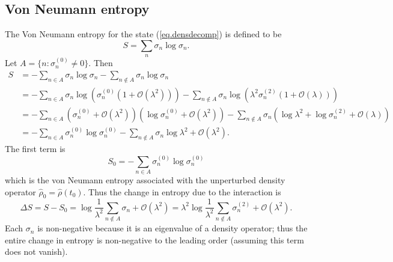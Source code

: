 \documentclass[11pt]{article}
\newcommand{\Od}[1]{\mathcal{O}{\left(#1\right)}}
\newcommand{\op}[1]{\hat{#1}}
\theoremstyle{theorem}
\theoremstyle{remark}
\theoremstyle{step}
\theoremstyle{gap}
\begin{document}
\subsection{Von Neumann entropy}

The Von Neumann entropy for the state (\ref{eq.densdecomp}) is defined to be
\[
S = \sum_{n} \sigma_n \log \sigma_n.
\]
Let \(A = \{n : \sigma_n^{(0)} \neq 0\}\). Then
\begin{align*}
S &= -\sum_{n \in A} \sigma_n \log \sigma_n-\sum_{n \not\in A} \sigma_n \log \sigma_n \\
&= - \sum_{n \in A} \sigma_n \log \left(\sigma_n^{(0)} \left(1 + \Od{\lambda^2}\right)\right)  - \sum_{n \not\in A} \sigma_n \log\left(\lambda^2\sigma_n^{(2)}\left(1 + \Od{\lambda}\right)\right) \\
&= - \sum_{n \in A} \left(\sigma_n^{(0)} + \Od{\lambda^2}\right) \left(\log \sigma_n^{(0)}+\Od{\lambda^2}\right) - \sum_{n \not\in A} \sigma_n \left(\log\lambda^2+\log\sigma_n^{(2)}+ \Od{\lambda}\right) \\
&= - \sum_{n \in A} \sigma_n^{(0)} \log \sigma_n^{(0)} -\sum_{n \not\in A} \sigma_n \log\lambda^2+ \Od{\lambda^2}.
\end{align*}
The first term is
\[S_0 = - \sum_{n \in A} \sigma_n^{(0)} \log \sigma_n^{(0)}\]
which is the von Neumann entropy associated with the unperturbed density operator \(\op{\rho}_0 = \op{\rho}\left(t_0\right)\). Thus the change in entropy due to the interaction is
\begin{equation}\label{eq.entropyresultnotA}
{\Delta S = S-S_0 = \log\frac{1}{\lambda^2}\sum_{n \not\in A} \sigma_n + \Od{\lambda^2} = \lambda^2 \log\frac{1}{\lambda^2} \sum_{n \not\in A}\sigma_n^{(2)}+ \Od{\lambda^2}.}
\end{equation}
Each \(\sigma_n\) is non-negative because it is an eigenvalue of a density operator; thus the entire change in entropy is non-negative to the leading order (assuming this term does not vanish).
\end{document}
